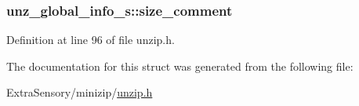 \hypertarget{structunz__global__info__s_a10b58ab57b62301de813ecac0e974363}{
\subsubsection[{size\+\_\+comment}]{ unz\+\_\+global\+\_\+info\+\_\+s\+::size\+\_\+comment}}\label{structunz__global__info__s_a10b58ab57b62301de813ecac0e974363}


Definition at line 96 of file unzip.\+h.



The documentation for this struct was generated from the following file\+:\begin{DoxyCompactItemize}
\item 
Extra\+Sensory/minizip/\hyperlink{unzip_8h}{unzip.\+h}\end{DoxyCompactItemize}
